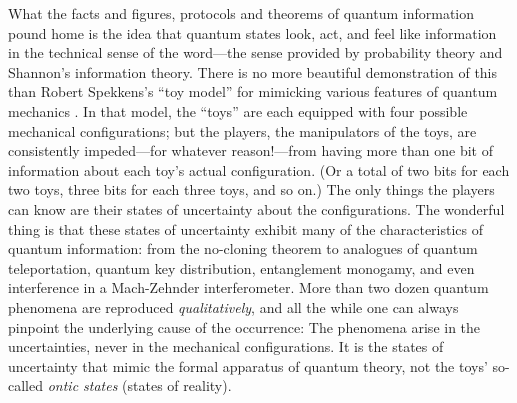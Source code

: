 What the facts and figures, protocols and theorems of quantum information pound home is the idea that quantum states look, act, and feel like information in the technical sense of the word---the sense provided by probability theory and Shannon's information theory.  There is no more beautiful demonstration of this than Robert Spekkens's ``toy model'' for mimicking various features of quantum mechanics \cite{Spekkens07}.  In that model, the ``toys'' are each equipped with four possible mechanical configurations; but the players, the manipulators of the toys, are consistently impeded---for whatever reason!---from having more than one bit of information about each toy's actual configuration. (Or a total of two bits for each two toys, three bits for each three toys, and so on.)  The only things the players can know are their states of uncertainty about the configurations.  The wonderful thing is that these states of uncertainty exhibit many of the characteristics of quantum information: from the no-cloning theorem to analogues of quantum teleportation, quantum key distribution, entanglement monogamy, and even interference in a Mach-Zehnder interferometer.  More than two dozen quantum phenomena are reproduced {\it qualitatively}, and all the while one can always pinpoint the underlying cause of the occurrence:  The phenomena arise in the uncertainties, never in the mechanical configurations.  It is the states of uncertainty that mimic the formal apparatus of quantum theory, not the toys' so-called {\it ontic states\/} (states of reality).

